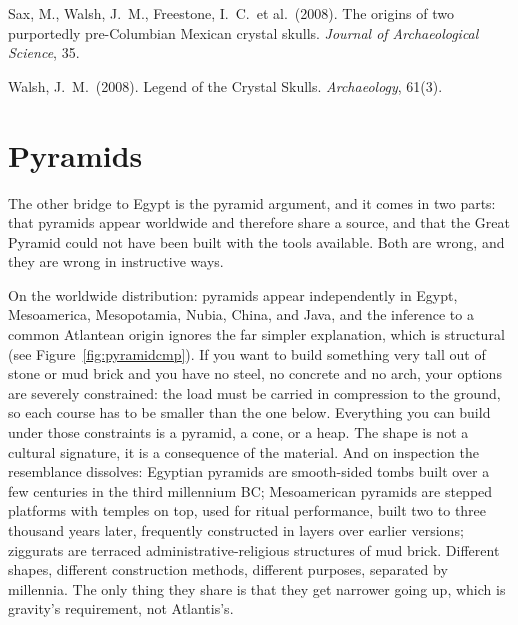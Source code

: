 \begin{srcnotes}
\item Sax, M., Walsh, J.\ M., Freestone, I.\ C.\ et al.\ (2008). The origins of two purportedly
pre-Columbian Mexican crystal skulls. \emph{Journal of Archaeological Science}, 35.
\item Walsh, J.\ M.\ (2008). Legend of the Crystal Skulls. \emph{Archaeology}, 61(3).
\end{srcnotes}

\section{Pyramids}\label{sec:pyramids}

The other bridge to Egypt is the pyramid argument, and it comes in two parts: that pyramids appear
worldwide and therefore share a source, and that the Great Pyramid could not have been built with the
tools available. Both are wrong, and they are wrong in instructive ways.

On the worldwide distribution: pyramids appear independently in Egypt, Mesoamerica, Mesopotamia,
Nubia, China, and Java, and the inference to a common Atlantean origin ignores the far simpler
explanation, which is structural (see Figure~\ref{fig:pyramidcmp}). If you want to build something very tall out of stone or mud brick
and you have no steel, no concrete and no arch, your options are severely constrained: the load must
be carried in compression to the ground, so each course has to be smaller than the one below.
Everything you can build under those constraints is a pyramid, a cone, or a heap. The shape is not a
cultural signature, it is a consequence of the material. And on inspection the resemblance dissolves:
Egyptian pyramids are smooth-sided tombs built over a few centuries in the third millennium BC;
Mesoamerican pyramids are stepped platforms with temples on top, used for ritual performance, built
two to three thousand years later, frequently constructed in layers over earlier versions; ziggurats
are terraced administrative-religious structures of mud brick. Different shapes, different
construction methods, different purposes, separated by millennia. The only thing they share is that
they get narrower going up, which is gravity's requirement, not Atlantis's.


